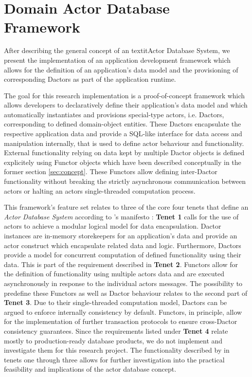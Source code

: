 
\section{Domain Actor Database Framework}\label{sec:framework}

After describing the general concept of an textit{Actor Database System}, we present the implementation of an application development framework which allows for the definition of an application's data model and the provisioning of corresponding Dactors as part of the application runtime.

The goal for this research implementation is a proof-of-concept framework which allows developers to declaratively define their application's data model
and which automatically instantiates and provisions special-type actors, i.e. Dactors, corresponding to defined domain-object entities.
These Dactors encapsulate the respective application data and provide a SQL-like interface for data access and manipulation internally, that is used to define actor behaviour and functionality.
External functionality relying on data kept by multiple Dactor objects is defined explicitely using Functor objects which have been described conceptually in the former section \ref{sec:concept}.
These Functors allow defining inter-Dactor functionality without breaking the strictly asynchronous communication between actors or halting an actors single-threaded computation process.

This framework's feature set relates to three of the core four tenets that define an \textit{Actor Database System} according to \citeauthor{manifesto}'s manifesto \cite{manifesto}:
\textbf{Tenet 1} calls for the use of actors to achieve a modular logical model for data encapsulation.
Dactor instances are in-memory storekeepers for an application's data and provide an actor construct which encapsulate related data and logic.
Furthermore, Dactors provide a model for concurrent computation of defined functionality using their data.
This is part of the requirement described in \textbf{Tenet 2}.
Functors allow for the definition of functionality using multiple actors data and are executed asynchronously in response to the individual actors messages.
The possibility to predefine these Functors as well as Dactor behaviour relates to the second part of \textbf{Tenet 3}.
Due to their single-threaded computation model, Dactors can be argued to enforce internally consistency by default.
Functors, in principle, allow for the implementation of further transaction protocols to ensure cross-Dactor consistency guarantees.
Since the requirements listed under \textbf{Tenet 4} relate mostly to production-ready database products, we do not implement and investigate them for this research project.
The functionality described by \citeauthor{manifesto} in tenets one through three allows for further investigation into the practical feasibility and implications of the actor database concept.

